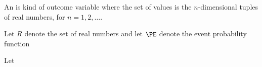 
\sbasic


























\sstart
{}



An  is kind
of outcome variable where the set
of values is the $n$-dimensional
tuples of real numbers, for
$n = 1, 2, \dots$.


Let $R$ denote the set of
real numbers and let $\PE$
denote the event probability
function

Let


\strats
